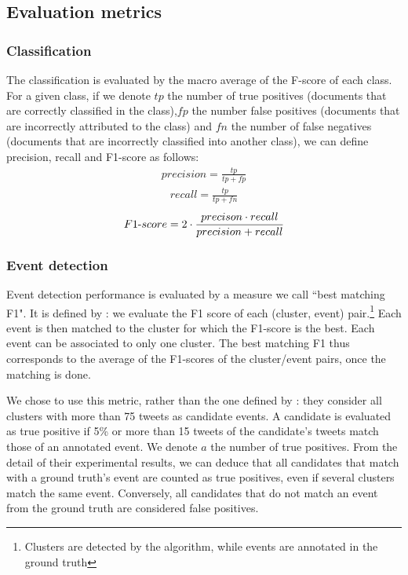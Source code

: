 \subsection{Evaluation metrics}

\subsubsection{Classification}
The classification is evaluated by the macro average of the F-score of each class. For a given class, if we denote $tp$ the number of true positives (documents that are correctly classified in the class),$fp$ the number false positives (documents that are incorrectly attributed to the class) and $fn$ the number of false negatives (documents that are incorrectly classified into another class), we can define precision, recall and F1-score as follows:
\begin{align}
precision = \frac{tp}{tp+fp}
\end{align}
\begin{align}
recall = \frac{tp}{tp+fn}
\end{align}
\begin{align}
F1{\text -}score = 2 \cdot \frac{precison \cdot recall}{precision + recall}
\end{align}

\subsubsection{Event detection}
\label{metric_best_matching}
Event detection performance is evaluated by a measure we call ``best matching F1". It is defined by \citet{yang1998study}: we evaluate the F1 score of each (cluster, event) pair.\footnote{Clusters are detected by the algorithm, while events are annotated in the ground truth} Each event is then matched to the cluster for which the F1-score is the best. Each event can be associated to only one cluster. The best matching F1 thus corresponds to the average of the F1-scores of the cluster/event pairs, once the matching is done.

We chose to use this metric, rather than the one defined by \citet{mcminn_real_2015}: they consider all clusters with more than 75 tweets as candidate events. A candidate is evaluated as true positive if 5\% or more than 15 tweets of the candidate's tweets match those of an annotated event. We denote $a$ the number of true positives. From the detail of their experimental results, we can deduce that all candidates that match with a ground truth's event are counted as true positives, even if several clusters match the same event. Conversely, all candidates that do not match an event from the ground truth are considered false positives. 

